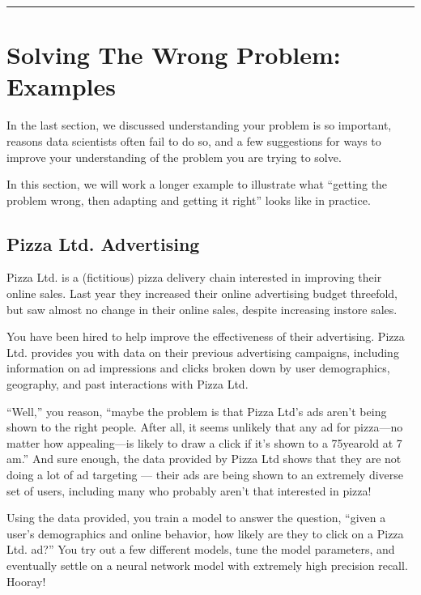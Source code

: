 \documentclass[letterpaper,10pt,english]{jupyterBook}
\begin{document}
\bigskip\hrule\bigskip


\sphinxstepscope


\section{Solving The Wrong Problem: Examples}
\label{\detokenize{20_problems_to_questions/15_solving_the_wrong_problem:solving-the-wrong-problem-examples}}\label{\detokenize{20_problems_to_questions/15_solving_the_wrong_problem::doc}}
\sphinxAtStartPar
In the last section, we discussed  understanding your problem is so important, reasons data scientists often fail to do so, and a few suggestions for ways to improve your understanding of the problem you are trying to solve.

\sphinxAtStartPar
In this section, we will work a longer example to illustrate what “getting the problem wrong, then adapting and getting it right” looks like in practice.


\subsection{Pizza Ltd. Advertising}
\label{\detokenize{20_problems_to_questions/15_solving_the_wrong_problem:pizza-ltd-advertising}}
\sphinxAtStartPar
Pizza Ltd. is a (fictitious) pizza delivery chain interested in improving their online sales. Last year they increased their online advertising budget three\sphinxhyphen{}fold, but saw almost no change in their online sales, despite increasing in\sphinxhyphen{}store sales.

\sphinxAtStartPar
You have been hired to help improve the effectiveness of their advertising. Pizza Ltd. provides you with data on their previous advertising campaigns, including information on ad impressions and clicks broken down by user demographics, geography, and past interactions with Pizza Ltd.

\sphinxAtStartPar
“Well,” you reason, “maybe the problem is that Pizza Ltd’s ads aren’t being shown to the right people. After all, it seems unlikely that any ad for pizza—no matter how appealing—is likely to draw a click if it’s shown to a 75\sphinxhyphen{}year\sphinxhyphen{}old at 7 am.” And sure enough, the data provided by Pizza Ltd shows that they are not doing a lot of ad targeting — their ads are being shown to an extremely diverse set of users, including many who probably aren’t that interested in pizza!

\sphinxAtStartPar
Using the data provided, you train a model to answer the question, “given a user’s demographics and online behavior, how likely are they to click on a Pizza Ltd. ad?” You try out a few different models, tune the model parameters, and eventually settle on a neural network model with extremely high precision  recall. Hooray!
\end{document}
